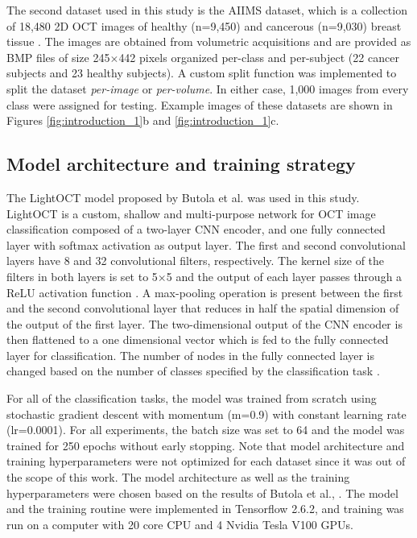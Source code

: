 \documentclass[fleqn,10pt]{wlscirep}
\begin{document}
The second dataset used in this study is the AIIMS dataset, which is a collection of 18,480 2D OCT images of healthy (n=9,450) and cancerous (n=9,030) breast tissue \cite{butola2019volumetric}. The images are obtained from volumetric acquisitions and are provided as BMP files of size 245$\times$442 pixels organized per-class and per-subject (22 cancer subjects and 23 healthy subjects). A custom split function was implemented to split the dataset \textit{per-image} or \textit{per-volume}. In either case, 1,000 images from every class were assigned for testing. Example images of these datasets are shown in Figures \ref{fig:introduction_1}b and \ref{fig:introduction_1}c. 

\subsection*{Model architecture and training strategy}
The LightOCT model proposed by Butola et al. \cite{butola2020deep} was used in this study. LightOCT is a custom, shallow and multi-purpose network for OCT image classification composed of a two-layer CNN encoder, and one fully connected layer with softmax activation as output layer. The first and second convolutional layers have 8 and 32 convolutional filters, respectively. The kernel size of the filters in both layers is set to 5$\times$5 and the output of each layer passes through a ReLU activation function \cite{butola2020deep}. A max-pooling operation is present between the first and the second convolutional layer that reduces in half the spatial dimension of the output of the first layer. The two-dimensional output of the CNN encoder is then flattened to a one dimensional vector which is fed to the fully connected layer for classification. The number of nodes in the fully connected layer is changed based on the number of classes specified by the classification task \cite{butola2020deep}. 

For all of the classification tasks, the model was trained from scratch using stochastic gradient descent with momentum (m=0.9) with constant learning rate (lr=0.0001). For all experiments, the batch size was set to 64 and the model was trained for 250 epochs without early stopping. Note that model architecture and training hyperparameters were not optimized for each dataset since it was out of the scope of this work. The model architecture as well as the training hyperparameters were chosen based on the results of Butola et al., \cite{butola2020deep}. The model and the training routine were implemented in Tensorflow 2.6.2, and training was run on a computer with 20 core CPU and 4 Nvidia Tesla V100 GPUs. 
\end{document}
